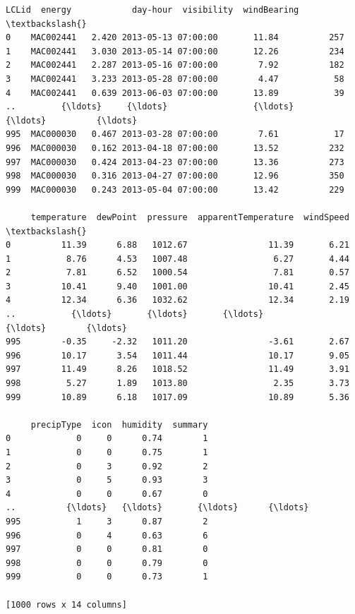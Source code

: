 \documentclass[11pt]{article}
\makeatletter
\newcommand{\boxspacing}{\kern\kvtcb@left@rule\kern\kvtcb@boxsep}
\newcommand{\prompt}[4]{
        {\ttfamily\llap{{\color{#2}[#3]:\hspace{3pt}#4}}\vspace{-\baselineskip}}
    }
\makeatother
\begin{document}
            \begin{tcolorbox}[breakable, size=fbox, boxrule=.5pt, pad at break*=1mm, opacityfill=0]
\prompt{Out}{outcolor}{151}{\boxspacing}
\begin{Verbatim}[commandchars=\\\{\}]
         LCLid  energy            day-hour  visibility  windBearing  \textbackslash{}
0    MAC002441   2.420 2013-05-13 07:00:00       11.84          257
1    MAC002441   3.030 2013-05-14 07:00:00       12.26          234
2    MAC002441   2.287 2013-05-16 07:00:00        7.92          182
3    MAC002441   3.233 2013-05-28 07:00:00        4.47           58
4    MAC002441   0.639 2013-06-03 07:00:00       13.89           39
..         {\ldots}     {\ldots}                 {\ldots}         {\ldots}          {\ldots}
995  MAC000030   0.467 2013-03-28 07:00:00        7.61           17
996  MAC000030   0.162 2013-04-18 07:00:00       13.52          232
997  MAC000030   0.424 2013-04-23 07:00:00       13.36          273
998  MAC000030   0.316 2013-04-27 07:00:00       12.96          350
999  MAC000030   0.243 2013-05-04 07:00:00       13.42          229

     temperature  dewPoint  pressure  apparentTemperature  windSpeed  \textbackslash{}
0          11.39      6.88   1012.67                11.39       6.21
1           8.76      4.53   1007.48                 6.27       4.44
2           7.81      6.52   1000.54                 7.81       0.57
3          10.41      9.40   1001.00                10.41       2.45
4          12.34      6.36   1032.62                12.34       2.19
..           {\ldots}       {\ldots}       {\ldots}                  {\ldots}        {\ldots}
995        -0.35     -2.32   1011.20                -3.61       2.67
996        10.17      3.54   1011.44                10.17       9.05
997        11.49      8.26   1018.52                11.49       3.91
998         5.27      1.89   1013.80                 2.35       3.73
999        10.89      6.18   1017.09                10.89       5.36

     precipType  icon  humidity  summary
0             0     0      0.74        1
1             0     0      0.75        1
2             0     3      0.92        2
3             0     5      0.93        3
4             0     0      0.67        0
..          {\ldots}   {\ldots}       {\ldots}      {\ldots}
995           1     3      0.87        2
996           0     4      0.63        6
997           0     0      0.81        0
998           0     0      0.79        0
999           0     0      0.73        1

[1000 rows x 14 columns]
\end{Verbatim}
\end{tcolorbox}
        
\end{document}
